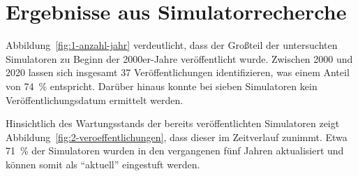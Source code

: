 \section{Ergebnisse aus Simulatorrecherche}\label{chap:results_sim}

Abbildung~\ref{fig:1-anzahl-jahr} verdeutlicht, dass der Großteil der untersuchten Simulatoren zu Beginn der 2000er-Jahre veröffentlicht wurde. Zwischen 2000 und 2020 lassen sich insgesamt 37 Veröffentlichungen identifizieren, was einem Anteil von 74~\% entspricht. Darüber hinaus konnte bei sieben Simulatoren kein Veröffentlichungsdatum ermittelt werden.

Hinsichtlich des Wartungsstands der bereits veröffentlichten Simulatoren zeigt Abbildung~\ref{fig:2-veroeffentlichungen}, dass dieser im Zeitverlauf zunimmt. Etwa 71~\% der Simulatoren wurden in den vergangenen fünf Jahren aktualisiert und können somit als \enquote{aktuell} eingestuft werden.

